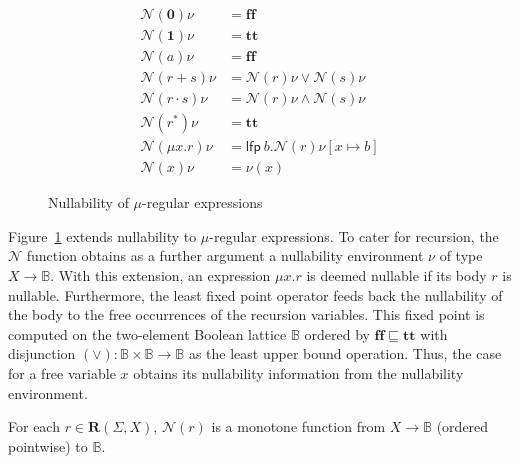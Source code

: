 \documentclass[runningheads, envcountsame, a4paper]{llncs}
\newcommand{\True}{\ensuremath{\mathbf{tt}}}%
\newcommand{\False}{\ensuremath{\mathbf{ff}}}%
\newcommand\bool{\mathbb{B}}
\newcommand\LFP{\textsf{lfp}}
\newcommand\Rnull{\mathbf0}
\newcommand\Rempty{\mathbf1}
\newcommand\Reg{\mathbf{R}}
\newcommand\Null{\mathcal{N}}
\begin{document}
\begin{figure}[t]
  \begin{align*}
    \Null (\Rnull) \nu &= \False \\
    \Null (\Rempty) \nu &= \True \\
    \Null (a) \nu &= \False \\
    \Null (r + s) \nu &= \Null (r) \nu \vee \Null (s) \nu \\
    \Null (r \cdot s) \nu &= \Null (r)\nu \wedge \Null (s)\nu \\
    \Null (r^*) \nu &= \True \\
    \Null (\mu x. r) \nu & = \LFP\ b.\Null (r)\nu[x \mapsto b] \\
    \Null (x)\nu &= \nu (x)
  \end{align*}
  \caption{Nullability of $\mu$-regular expressions}
  \label{fig:nullability-mu-regular}
\end{figure}
Figure~\ref{fig:nullability-mu-regular} extends nullability to $\mu$-regular expressions. To cater
for recursion, the $\Null$ function obtains as a further argument a nullability environment $\nu$ of
type $X \to \bool$. With this extension, an  expression $\mu x.r$ is deemed nullable
if its body  $r$ is nullable. Furthermore, the least fixed point operator feeds back the nullability of
the body to the free occurrences of the recursion variables. This
fixed point is computed on the
two-element Boolean lattice $\bool$ ordered by $\False \sqsubseteq \True$ with
disjunction $(\vee) : \bool \times \bool \to \bool$ as the
least upper bound operation. Thus, the case for a free variable $x$
obtains its nullability information from the nullability environment. 
\begin{lemma}
  For each $r\in\Reg (\Sigma, X)$, $\Null (r)$ is a monotone function
  from $X \to \bool$ (ordered pointwise) to $\bool$.
\end{lemma}
\end{document}
